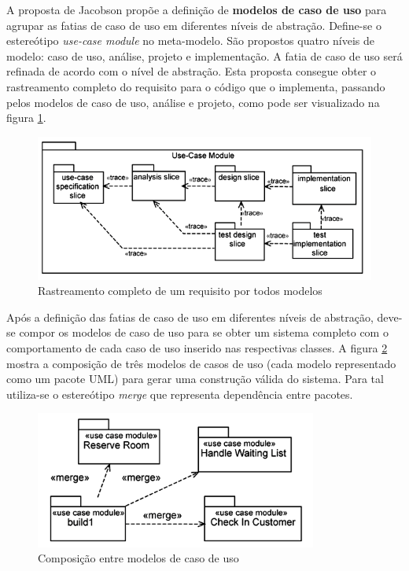 A proposta de Jacobson propõe a definição de \textbf{modelos de caso de uso} para agrupar as fatias de caso de uso em
diferentes níveis de abstração. Define-se o estereótipo \textit{use-case module} no meta-modelo. São propostos quatro níveis de modelo: caso de uso,
análise, projeto e implementação. A fatia de caso de uso será refinada de acordo com o nível de abstração. Esta proposta consegue obter o rastreamento
completo do requisito para o código que o implementa, passando pelos modelos de caso de uso, análise e projeto, como pode ser visualizado 
na figura \ref{fig:jacobson_use_case_modules}. 

\begin{figure}
	\centering
	\includegraphics[width=450px]{img/jacobson_use_case_modules.png}
	\caption{Rastreamento completo de um requisito por todos modelos}\label{fig:jacobson_use_case_modules}
\end{figure}

Após a definição das fatias de caso de uso em diferentes níveis de abstração, deve-se compor os modelos de caso de uso para se obter um sistema
completo com o comportamento de cada caso de uso inserido nas respectivas classes. A figura \ref{fig:jacobson_use_case_merge} mostra a composição de
três modelos de casos de uso (cada modelo representado como um pacote UML) para gerar uma construção válida do sistema. Para tal utiliza-se o
estereótipo \textit{merge} que representa dependência entre pacotes.

\begin{figure}
	\centering
	\includegraphics[width=350px]{img/jacobson_use_case_merge.png}
	\caption{Composição entre modelos de caso de uso}\label{fig:jacobson_use_case_merge}
\end{figure}

